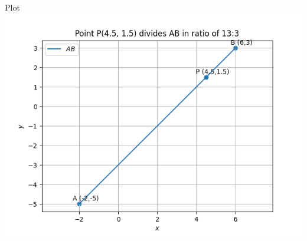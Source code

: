 \documentclass{beamer}
\begin{document}
\begin{frame}{Plot}
    \centering
    \includegraphics[width=\columnwidth, height=0.8\textheight, keepaspectratio]{figs/fig.png}
\end{frame}
\end{document}
